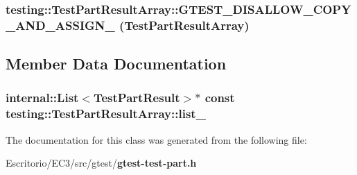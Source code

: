 \subsubsection{\setlength{\rightskip}{0pt plus 5cm}testing::TestPartResultArray::GTEST\_\-DISALLOW\_\-COPY\_\-AND\_\-ASSIGN\_\- ({\bf TestPartResultArray})\hspace{0.3cm}{\tt  [private]}}\label{classtesting_1_1TestPartResultArray_dedd5daec4308625ab28f8082ae97d85}




\subsection{Member Data Documentation}
\subsubsection{\setlength{\rightskip}{0pt plus 5cm}internal::List$<${\bf TestPartResult}$>$$\ast$ const {\bf testing::TestPartResultArray::list\_\-}\hspace{0.3cm}{\tt  [private]}}\label{classtesting_1_1TestPartResultArray_c2aead301bd604d826686b9bc671edc4}




The documentation for this class was generated from the following file:\begin{CompactItemize}
\item 
Escritorio/EC3/src/gtest/{\bf gtest-test-part.h}\end{CompactItemize}
